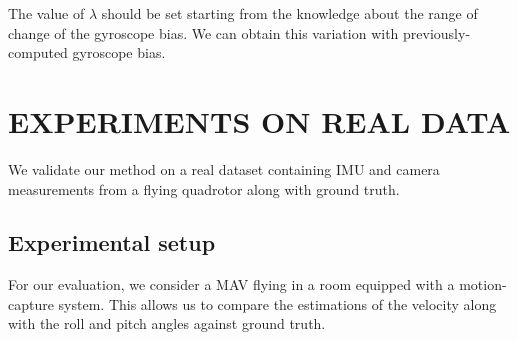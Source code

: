 \documentclass[letterpaper, 10 pt, conference]{ieeeconf}  %
\begin{document}
The value of $\lambda$ should be set starting from the knowledge about the range of change of the gyroscope bias.
We can obtain this variation with previously-computed gyroscope bias.

\section{EXPERIMENTS ON REAL DATA}\label{SectionPerformance}

We validate our method on a real dataset containing IMU and camera measurements from a flying quadrotor along with ground truth.

\subsection{Experimental setup}\label{SubsectionSetup}

For our evaluation, we consider a MAV flying in a room equipped with a motion-capture system.
This allows us to compare the estimations of the velocity along with the roll and pitch angles against ground truth.
\end{document}
